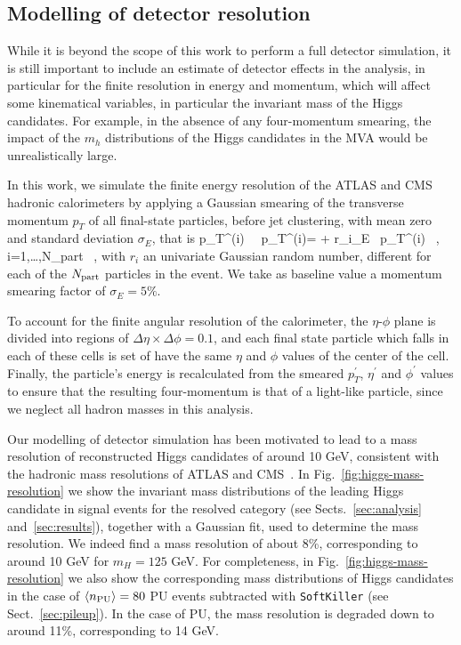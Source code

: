 \subsection{Modelling of detector resolution}
\label{sec:detectormodeling}

While it is beyond the scope of this work to perform a full
detector simulation, it is still important to include an estimate of detector
effects in the analysis, in particular for the finite resolution
in energy and momentum, which will affect some kinematical variables, in particular
the invariant mass of the Higgs candidates.
%
For example, in the absence of any four-momentum smearing, the impact of the $m_h$
distributions of the Higgs candidates in the MVA
would be unrealistically large.

In this work, we simulate the finite energy resolution of the ATLAS and CMS
hadronic calorimeters by applying a Gaussian smearing of the transverse
momentum $p_T$ of all
final-state particles, before jet clustering,
with mean zero and standard deviation $\sigma_E$, that is
%
\be
\label{eq:smearing}
p_T^{(i)} \, \to \, p_T^{(i)\prime}= + r_i\cdot\sigma_E \rp\, p_T^{(i)} \, , \quad
i=1,\ldots,N_{\rm part} \, ,
\ee
with $r_i$ an univariate Gaussian random number, different for each
of the $N_{\rm part}$ particles in the event.
%
We take as baseline value a momentum smearing
factor of $\sigma_E=5\%$.
%


To account for the finite angular resolution of the calorimeter,
the $\eta$-$\phi$ plane is divided into regions of
$\Delta \eta \times \Delta \phi=0.1$, and each final state particle
which falls in each of these cells is set of have the same $\eta$
and $\phi$ values of the center of the cell.
%
Finally, the particle's energy is recalculated from the smeared $p_T^\prime$,
$\eta^\prime$ and $\phi^\prime$ values to ensure that the resulting
four-momentum is that of a light-like particle, since we neglect all
hadron masses in this analysis.


Our modelling of detector simulation has been motivated
to lead to a mass resolution of
reconstructed Higgs candidates of around 10 GeV, consistent
with the hadronic mass resolutions of ATLAS and CMS~\cite{Aad:2012gxa,Chatrchyan:2013zna,Aad:2014xzb}.
%
In Fig.~\ref{fig:higgs-mass-resolution} we show the
invariant mass distributions of the leading
Higgs candidate in signal events for the
resolved category (see Sects.~\ref{sec:analysis}
and~\ref{sec:results}), together with
a Gaussian fit,
used to determine the mass resolution.
%
We indeed  find a mass resolution of about 8\%, corresponding
    to around 10 GeV for $m_H=125$ GeV.
%
    For completeness, in Fig.~\ref{fig:higgs-mass-resolution}
    we also show the corresponding
    mass distributions of Higgs candidates
    in the case of $\left\langle n_{\rm PU}\right\rangle=80$ PU events
    subtracted with {\tt SoftKiller} (see Sect.~\ref{sec:pileup}).
    In the case of PU, the mass resolution is degraded down to
    around 11\%, corresponding to 
    14 GeV.
        
